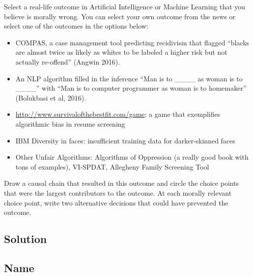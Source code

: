 \documentclass[submit]{harvardml}
\begin{document}
\begin{problem}

Select a real-life outcome in Artificial Intelligence or Machine Learning 
that you believe is morally wrong. You can select your own outcome from 
the news or select one of the outcomes in the options below:

\begin{itemize}
    \item COMPAS, a case management tool predicting recidivism that 
        flagged “blacks are almost twice as likely as whites to be 
        labeled a higher risk but not actually re-offend” (Angwin 
        2016).
        
    \item An NLP algorithm filled in the inference “Man is to 
        \_\_\_\_ as woman is to \_\_\_\_” with “Man is 
        to computer programmer as woman is to homemaker” (Bolukbasi 
        et al, 2016).
        
    \item \url{http://www.survivalofthebestfit.com/game}: a game that 
        exemplifies algorithmic bias in resume screening
        
    \item IBM Diversity in faces: insufficient training data for 
        darker-skinned faces
        
    \item Other Unfair Algorithms: Algorithms of Oppression (a really 
        good book with tons of examples), VI-SPDAT, Allegheny Family 
        Screening Tool
        
\end{itemize}
Draw a causal chain that resulted in this outcome and circle the choice points that were the largest contributors to the outcome. At each morally relevant choice point, write two alternative decisions that could have prevented the outcome.

\end{problem}

\subsection*{Solution}

\newpage
\subsection*{Name}
\end{document}

